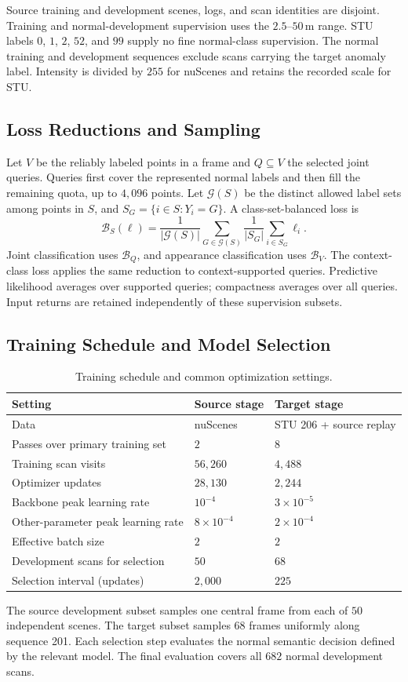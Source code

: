 \documentclass{article}
\begin{document}
Source training and development scenes, logs, and scan identities are disjoint. Training and normal-development supervision uses the $2.5$--$50$\,m range. STU labels $0$, $1$, $2$, $52$, and $99$ supply no fine normal-class supervision. The normal training and development sequences exclude scans carrying the target anomaly label. Intensity is divided by $255$ for nuScenes and retains the recorded scale for STU.

\subsection{Loss Reductions and Sampling}
Let $V$ be the reliably labeled points in a frame and $Q\subseteq V$ the selected joint queries. Queries first cover the represented normal labels and then fill the remaining quota, up to $4{,}096$ points. Let $\mathcal G(S)$ be the distinct allowed label sets among points in $S$, and $S_G=\{i\in S:Y_i=G\}$. A class-set-balanced loss is
\begin{equation}
 \mathcal B_S(\ell)=\frac{1}{|\mathcal G(S)|}
 \sum_{G\in\mathcal G(S)}\frac{1}{|S_G|}\sum_{i\in S_G}\ell_i.
\end{equation}
Joint classification uses $\mathcal B_Q$, and appearance classification uses $\mathcal B_V$. The context-class loss applies the same reduction to context-supported queries. Predictive likelihood averages over supported queries; compactness averages over all queries. Input returns are retained independently of these supervision subsets.

\subsection{Training Schedule and Model Selection}
\begin{table}[ht]
\centering\small
\caption{Training schedule and common optimization settings.}
\begin{tabular}{lll}
\toprule
Setting & Source stage & Target stage\\
\midrule
Data & nuScenes & STU 206 + source replay\\
Passes over primary training set & $2$ & $8$\\
Training scan visits & $56{,}260$ & $4{,}488$\\
Optimizer updates & $28{,}130$ & $2{,}244$\\
Backbone peak learning rate & $10^{-4}$ & $3\times10^{-5}$\\
Other-parameter peak learning rate & $8\times10^{-4}$ & $2\times10^{-4}$\\
Effective batch size & $2$ & $2$\\
Development scans for selection & $50$ & $68$\\
Selection interval (updates) & $2{,}000$ & $225$\\
\bottomrule
\end{tabular}
\end{table}
The source development subset samples one central frame from each of $50$ independent scenes. The target subset samples $68$ frames uniformly along sequence 201. Each selection step evaluates the normal semantic decision defined by the relevant model. The final evaluation covers all $682$ normal development scans.
\end{document}
